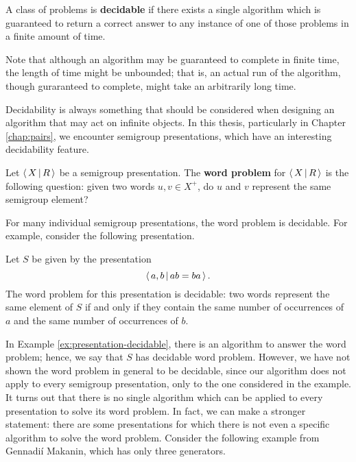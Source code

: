 \begin{definition}
  \label{def:decidable}
  A class of problems is \textbf{decidable} if there exists a single algorithm
  which is guaranteed to return a correct answer to any instance of one of those
  problems in a finite amount of time.
\end{definition}

Note that although an algorithm may be guaranteed to complete in finite time,
the length of time might be unbounded; that is, an actual run of the algorithm,
though guraranteed to complete, might take an arbitrarily long time.

Decidability is always something that should be considered when designing an
algorithm that may act on infinite objects.  In this thesis, particularly in
Chapter \ref{chap:pairs}, we encounter semigroup presentations, which have an
interesting decidability feature.

\begin{definition}
  \label{def:word-problem}
  Let $\left\langle \, X \, \middle| \, R \, \right\rangle$ be a semigroup presentation.  The \textbf{word problem} for
  $\left\langle \, X \, \middle| \, R \, \right\rangle$ is the following question: given two words $u, v \in X^+$, do $u$
  and $v$ represent the same semigroup element?
\end{definition}

For many individual semigroup presentations, the word problem is decidable.  For
example, consider the following presentation.

\begin{example}
  \label{ex:presentation-decidable}
  Let $S$ be given by the presentation
  $$\left\langle \, a,b \, \middle| \, ab=ba \, \right\rangle.$$
  The word problem for this presentation is decidable: two words represent the
  same element of $S$ if and only if they contain the same number of occurrences
  of $a$ and the same number of occurrences of $b$.
\end{example}

In Example \ref{ex:presentation-decidable}, there is an algorithm to answer the
word problem; hence, we
say that $S$ has decidable word problem.  However, we have not shown the word
problem in general to be decidable, since our algorithm does not apply to every
semigroup presentation, only to the one considered in the example.  It turns out
that there is no single algorithm which can be applied to every presentation to
solve its word problem.  In fact, we can make a stronger statement: there are
some presentations for which there is not even a specific algorithm to solve
the word problem.  Consider the
following example from Gennadi\'{i} Makanin, which has only three generators.

